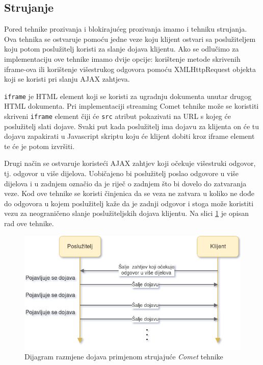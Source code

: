 \documentclass[times, utf8, zavrsni]{fer}
\begin{document}
\subsection{Strujanje}
Pored tehnike prozivanja i blokirajućeg prozivanja imamo i tehniku strujanja. Ova tehnika se ostvaruje pomoću jedne veze koju klijent ostvari sa poslužiteljem koju potom poslužitelj koristi za slanje dojava klijentu. Ako se odlučimo za implementaciju ove tehnike imamo dvije opcije: korištenje metode skrivenih iframe-ova ili korištenje višestrukog odgovora pomoću XMLHttpRequest objekta koji se koristi pri slanju AJAX zahtjeva.

{\tt iframe} je HTML element koji se koristi za ugradnju dokumenta unutar drugog HTML dokumenta. Pri implementaciji streaming Comet tehnike može se koristiti skriveni {\tt iframe} element čiji će {\tt src}  atribut pokazivati na URL s kojeg će poslužitelj slati dojave. Svaki put kada poslužitelj ima dojavu za klijenta on će tu dojavu zapakirati u Javascript skriptu koju će klijent dobiti kroz iframe element te će je potom izvršiti.

Drugi način se ostvaruje koristeći AJAX zahtjev koji očekuje višestruki odgovor, tj. odgovor u više dijelova. Uobičajeno bi poslužitelj poslao odgovore u više dijelova i u zadnjem označio da je riječ o zadnjem što bi dovelo do zatvaranja veze. Kod ove tehnike se koristi činjenica da se veza ne zatvara u koliko ne dođe do odgovora u kojem poslužitelj kaže da je zadnji odgovor i stoga može koristiti vezu za neograničeno slanje poslužiteljskih dojava klijentu. Na slici \ref{fig:streaming-image} je opisan rad ove tehnike. \citep{carbou2011}

\begin{figure}[htb]
\centering
\includegraphics[width=\linewidth]{img/streaming.png}
\caption{Dijagram razmjene dojava primjenom strujajuće {\em Comet} tehnike}
\label{fig:streaming-image}
\end{figure}
\end{document}

